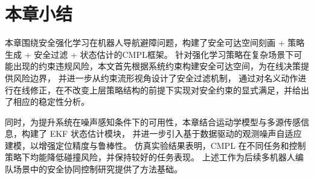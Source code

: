 \section{本章小结}

本章围绕安全强化学习在机器人导航避障问题，构建了安全可达空间刻画 + 策略生成 + 安全过滤 + 状态估计的CMPL框架。
针对强化学习策略在复杂场景下可能出现的约束违规风险，本文首先根据系统约束构建安全可达空间，为在线决策提供风险边界，
并进一步从约束流形视角设计了安全过滤机制，
通过对名义动作进行在线修正，在不改变上层策略结构的前提下实现对安全约束的显式满足，并给出了相应的稳定性分析。

同时，为提升系统在噪声感知条件下的可用性，本章结合运动学模型与多源传感信息，构建了 EKF 状态估计模块，
并进一步引入基于数据驱动的观测噪声自适应建模，以增强定位精度与鲁棒性。
仿真实验结果表明，CMPL 在不同任务和控制策略下均能降低碰撞风险，并保持较好的任务表现。
上述工作为后续多机器人编队场景中的安全协同控制研究提供了方法基础。
